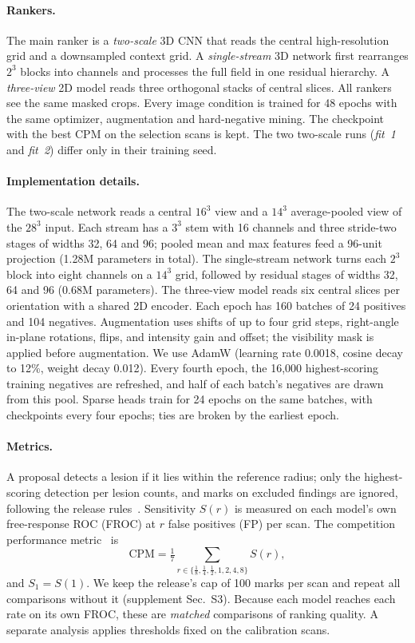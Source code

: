 \paragraph{Rankers.} The main ranker is a \emph{two-scale} 3D CNN that reads the central high-resolution grid and a downsampled context grid. A \emph{single-stream} 3D network first rearranges $2^3$ blocks into channels and processes the full field in one residual hierarchy. A \emph{three-view} 2D model reads three orthogonal stacks of central slices. All rankers see the same masked crops. Every image condition is trained for 48 epochs with the same optimizer, augmentation and hard-negative mining. The checkpoint with the best CPM on the selection scans is kept. The two two-scale runs (\emph{fit~1} and \emph{fit~2}) differ only in their training seed.

\paragraph{Implementation details.} The two-scale network reads a central $16^3$ view and a $14^3$ average-pooled view of the $28^3$ input. Each stream has a $3^3$ stem with 16 channels and three stride-two stages of widths 32, 64 and 96; pooled mean and max features feed a 96-unit projection (1.28M parameters in total). The single-stream network turns each $2^3$ block into eight channels on a $14^3$ grid, followed by residual stages of widths 32, 64 and 96 (0.68M parameters). The three-view model reads six central slices per orientation with a shared 2D encoder. Each epoch has 160 batches of 24 positives and 104 negatives. Augmentation uses shifts of up to four grid steps, right-angle in-plane rotations, flips, and intensity gain and offset; the visibility mask is applied before augmentation. We use AdamW (learning rate 0.0018, cosine decay to 12\%, weight decay 0.012). Every fourth epoch, the 16,000 highest-scoring training negatives are refreshed, and half of each batch's negatives are drawn from this pool. Sparse heads train for 24 epochs on the same batches, with checkpoints every four epochs; ties are broken by the earliest epoch.

\paragraph{Metrics.} A proposal detects a lesion if it lies within the reference radius; only the highest-scoring detection per lesion counts, and marks on excluded findings are ignored, following the release rules~\cite{setio2017luna16}. Sensitivity $S(r)$ is measured on each model's own free-response ROC (FROC) at $r$ false positives (FP) per scan. The competition performance metric~\cite{niemeijer2011combining,setio2017luna16} is
\begin{equation}
\mathrm{CPM}=\tfrac{1}{7}\textstyle\sum_{r\in\{\frac18,\frac14,\frac12,1,2,4,8\}} S(r),
\end{equation}
and $S_1=S(1)$. We keep the release's cap of 100 marks per scan and repeat all comparisons without it (supplement Sec.~S3). Because each model reaches each rate on its own FROC, these are \emph{matched} comparisons of ranking quality. A separate analysis applies thresholds fixed on the calibration scans.

